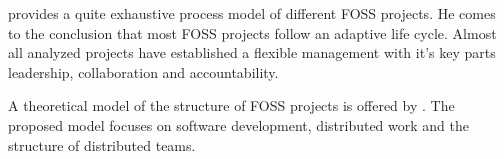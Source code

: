 \textcite{Johnson2001} provides a quite exhaustive process model of different
\ac{FOSS} projects. He comes to the conclusion that most \ac{FOSS} projects
follow an adaptive life cycle. Almost all analyzed projects have established a
flexible management with it's key parts leadership, collaboration and
accountability.

A theoretical model of the structure of \ac{FOSS} projects is offered by
\textcite{Crowston2005}. The proposed model focuses on software development,
distributed work and the structure of distributed teams.


